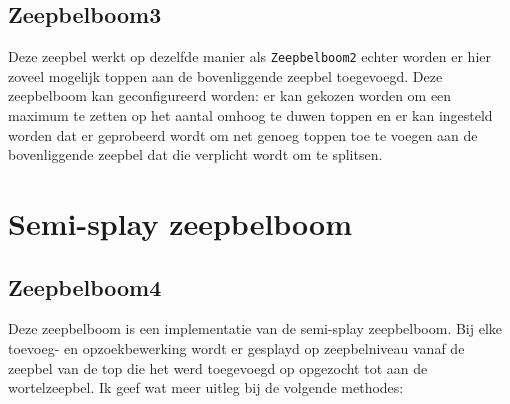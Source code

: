 \documentclass[12pt,hidelinks]{article}
\begin{document}
    \subsection{Zeepbelboom3}
    Deze zeepbel werkt op dezelfde manier als {\tt Zeepbelboom2} echter worden er hier
    zoveel mogelijk toppen aan de bovenliggende zeepbel toegevoegd. Deze zeepbelboom
    kan geconfigureerd worden: er kan gekozen worden om een maximum te zetten op het 
    aantal omhoog te duwen toppen en er kan ingesteld worden dat er geprobeerd wordt
    om net genoeg toppen toe te voegen aan de bovenliggende zeepbel dat die verplicht
    wordt om te splitsen.  
    \section{Semi-splay zeepbelboom}
    \subsection{Zeepbelboom4}
    Deze zeepbelboom is een implementatie van de semi-splay zeepbelboom. 
    Bij elke toevoeg- en opzoekbewerking wordt er gesplayd op zeepbelniveau vanaf de zeepbel van de top die het werd toegevoegd op opgezocht tot aan de wortelzeepbel.
    Ik geef wat meer uitleg bij de volgende methodes:
\end{document}
